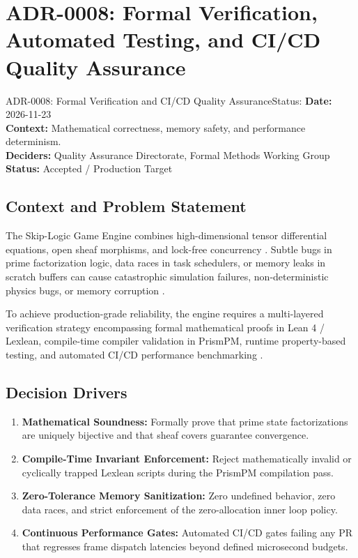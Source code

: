 \section{ADR-0008: Formal Verification, Automated Testing, and CI/CD Quality Assurance}
\label{sec:adr0008}

\begin{adrbox}{ADR-0008: Formal Verification and CI/CD Quality Assurance}{Status: }
\textbf{Date:} 2026-11-23 \\
\textbf{Context:} Mathematical correctness, memory safety, and performance determinism. \\
\textbf{Deciders:} Quality Assurance Directorate, Formal Methods Working Group \\
\textbf{Status:} Accepted / Production Target
\end{adrbox}

\subsection{Context and Problem Statement}
The Skip-Logic Game Engine combines high-dimensional tensor differential equations, open sheaf morphisms, and lock-free concurrency \cite{mourokh2024qari}. Subtle bugs in prime factorization logic, data races in task schedulers, or memory leaks in scratch buffers can cause catastrophic simulation failures, non-deterministic physics bugs, or memory corruption \cite{gregory2018game, herlihy2020art}.

To achieve production-grade reliability, the engine requires a multi-layered verification strategy encompassing formal mathematical proofs in Lean 4 / Lexlean, compile-time compiler validation in PrismPM, runtime property-based testing, and automated CI/CD performance benchmarking \cite{lean4manual, intel2023optimization}.

\subsection{Decision Drivers}
\begin{enumerate}[label=\bfseries D\arabic*.]
    \item \textbf{Mathematical Soundness:} Formally prove that prime state factorizations are uniquely bijective and that sheaf covers guarantee convergence.
    \item \textbf{Compile-Time Invariant Enforcement:} Reject mathematically invalid or cyclically trapped Lexlean scripts during the PrismPM compilation pass.
    \item \textbf{Zero-Tolerance Memory Sanitization:} Zero undefined behavior, zero data races, and strict enforcement of the zero-allocation inner loop policy.
    \item \textbf{Continuous Performance Gates:} Automated CI/CD gates failing any PR that regresses frame dispatch latencies beyond defined microsecond budgets.
\end{enumerate}

